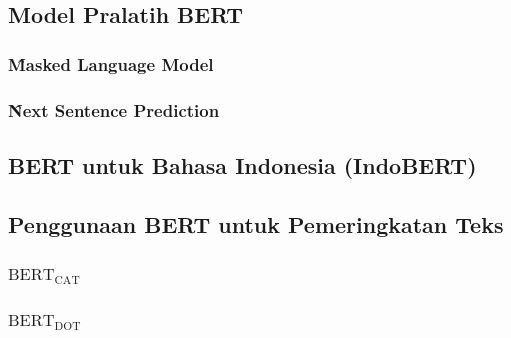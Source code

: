 	\subsection{Model Pralatih BERT}

		\subsubsection{\f{Masked Language Model}}

		\subsubsection{\f{Next Sentence Prediction}}

	\subsection{BERT untuk Bahasa Indonesia (IndoBERT)}

	\subsection{Penggunaan BERT untuk Pemeringkatan Teks}
		\subsubsection{$\text{BERT}_{\text{CAT}}$}

		\subsubsection{$\text{BERT}_{\text{DOT}}$}




